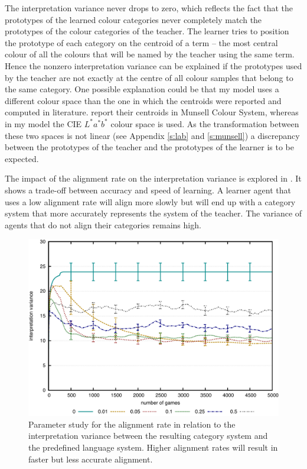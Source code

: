 The interpretation variance never drops to zero, which reflects the
fact that the prototypes of the learned colour categories never
completely match the prototypes of the colour categories of the
teacher. The learner tries to position the prototype of each category
on the centroid of a term -- the most central colour of all the colours that will
be named by the teacher using the same term. Hence the nonzero
interpretation variance can be explained if the prototypes used by the
teacher are not exactly at the centre of all colour samples that
belong to the same category. One possible explanation could be that
my model uses a different colour space than the one in which the
centroids were reported and computed in literature. \cite{sturges95location}
report their centroids in Munsell Colour System, 
whereas in my model the CIE $L^*a^*b^*$ colour space is used. 
As the transformation between these two spaces is not linear 
(see Appendix \ref{s:lab} and \ref{s:munsell}) a discrepancy between the prototypes 
of the teacher and the prototypes of the learner is to be expected.

The impact of the alignment rate on the interpretation variance is
explored in . It shows a
trade-off between accuracy and speed of learning. A learner agent that
uses a low alignment rate will align more slowly but will end up
with a category system that more accurately represents the system of
the teacher. The variance of agents that do not align their categories
remains high.

\begin{figure}[htbp]
  \begin{center}
    \includegraphics[width=.8\textwidth]{./basic-operators/figures/alignment-rate-vs-variance.pdf}
    \caption[Parameter study for alignment rate]{Parameter study for
      the alignment rate in relation to the interpretation variance
      between the resulting category system and the predefined
      language system. Higher alignment rates will result in faster
      but less accurate alignment.}
    \label{f:basic-strategy-alignment-rate-vs-variance}
  \end{center}
\end{figure}

